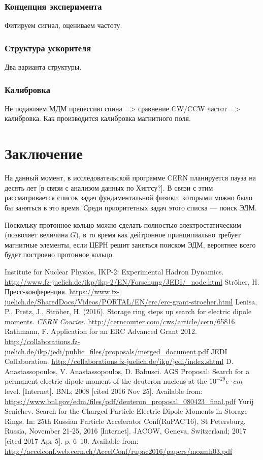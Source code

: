 \documentclass{extarticle}
\begin{document}
	\subsubsection{Концепция эксперимента}
		Фитируем сигнал, оцениваем частоту.
	\subsubsection{Структура ускорителя}
		Два варианта структуры.
	\subsubsection{Калибровка}
		Не подавляем МДМ прецессию спина => сравнение CW/CCW частот => калибровка. Как производится калибровка магнитного поля.
		
\section*{Заключение}
На данный момент, в исследовательской программе CERN планируется пауза на десять лет [в связи с анализом данных по Хиггсу?]. В связи с этим рассматривается список задач фундаментальной физики, которыми можно было бы заняться в это время. Среди приоритетных задач этого списка --- поиск ЭДМ. 

Поскольку протонное кольцо можно сделать полностью электростатическим (позволяет величина $G$), в то время как дейтронное принципиально требует магнитные элементы, если ЦЕРН решит заняться поиском ЭДМ, вероятнее всего будет построено протонное кольцо.
\begin{thebibliography}{0}
	Institute for Nuclear Physics, IKP-2: Experimental Hadron Dynamics. \url{http://www.fz-juelich.de/ikp/ikp-2/EN/Forschung/JEDI/_node.html}
	Str\"oher, H. Пресс-конференция. \url{https://www.fz-juelich.de/SharedDocs/Videos/PORTAL/EN/erc/erc-grant-stroeher.html}
	Lenisa, P., Pretz, J., Str\"oher, H. (2016). Storage ring steps up search for electric dipole moments. \textit{CERN Courier}. \url{http://cerncourier.com/cws/article/cern/65816}
	Rathmann, F. Application for an ERC Advanced Grant 2012. \url{http://collaborations.fz-juelich.de/ikp/jedi/public_files/proposals/merged_document.pdf}
	JEDI Collaboration. \url{http://collaborations.fz-juelich.de/ikp/jedi/index.shtml}
	D. Anastassopoulos, V. Anastassopoulos, D. Babusci. AGS Proposal: Search for a permanent electric dipole moment of the deuteron nucleus at the $10^{-29} e\cdot cm$ level. [Internet]. BNL; 2008 [cited 2016 Nov 25]. Available from: \url{https://www.bnl.gov/edm/files/pdf/deuteron_proposal_080423_final.pdf}
	Yurij Senichev. Search for the Charged Particle Electric Dipole Moments in Storage Rings. In: 25th Russian Particle Accelerator Conf(RuPAC’16), St Petersburg, Russia, November 21-25, 2016 [Internet]. JACOW, Geneva, Switzerland; 2017 [cited 2017 Apr 5]. p. 6–10. Available from: \url{http://accelconf.web.cern.ch/AccelConf/rupac2016/papers/mozmh03.pdf}
	
\end{thebibliography}
\end{document}
